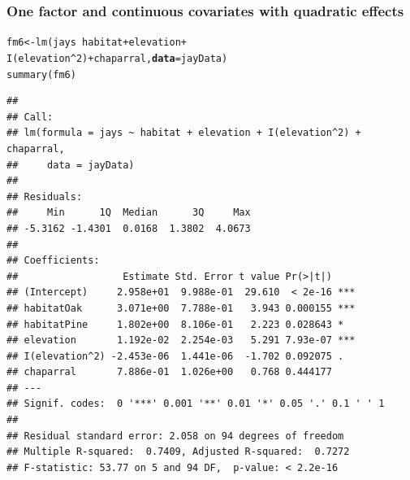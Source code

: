 \documentclass[color=usenames,dvipsnames]{beamer}\usepackage[]{graphicx}\usepackage[]{color}
\makeatletter
\newcommand{\hlnum}[1]{\textcolor[rgb]{0.69,0.494,0}{#1}}%
\newcommand{\hlopt}[1]{\textcolor[rgb]{0,0,0}{#1}}%
\newcommand{\hlstd}[1]{\textcolor[rgb]{0,0,0}{#1}}%
\newcommand{\hlkwb}[1]{\textcolor[rgb]{0,0.341,0.682}{#1}}%
\newcommand{\hlkwc}[1]{\textcolor[rgb]{0,0,0}{\textbf{#1}}}%
\newcommand{\hlkwd}[1]{\textcolor[rgb]{0.004,0.004,0.506}{#1}}%
\newenvironment{kframe}{%
 \def\at@end@of@kframe{}%
 \ifinner\ifhmode%
  \def\at@end@of@kframe{\end{minipage}}%
  \begin{minipage}{\columnwidth}%
 \fi\fi%
 \def\FrameCommand##1{\hskip\@totalleftmargin \hskip-\fboxsep
 \colorbox{shadecolor}{##1}\hskip-\fboxsep
     \hskip-\linewidth \hskip-\@totalleftmargin \hskip\columnwidth}%
 \MakeFramed {\advance\hsize-\width
   \@totalleftmargin\z@ \linewidth\hsize
   \@setminipage}}%
 {\par\unskip\endMakeFramed%
 \at@end@of@kframe}
\newenvironment{knitrout}{}{} %
\makeatother
\begin{document}
\begin{frame}[fragile]
  \frametitle{\small One factor and continuous covariates with quadratic effects}
  \tiny
\begin{knitrout}\tiny
{}\color{fgcolor}\begin{kframe}
\begin{alltt}
\hlstd{fm6} \hlkwb{<-} \hlkwd{lm}\hlstd{(jays} \hlopt{~} \hlstd{habitat} \hlopt{+} \hlstd{elevation} \hlopt{+}
          \hlkwd{I}\hlstd{(elevation}\hlopt{^}\hlnum{2}\hlstd{)} \hlopt{+} \hlstd{chaparral,} \hlkwc{data}\hlstd{=jayData)}
\hlkwd{summary}\hlstd{(fm6)}
\end{alltt}
\begin{verbatim}
## 
## Call:
## lm(formula = jays ~ habitat + elevation + I(elevation^2) + chaparral, 
##     data = jayData)
## 
## Residuals:
##     Min      1Q  Median      3Q     Max 
## -5.3162 -1.4301  0.0168  1.3802  4.0673 
## 
## Coefficients:
##                  Estimate Std. Error t value Pr(>|t|)    
## (Intercept)     2.958e+01  9.988e-01  29.610  < 2e-16 ***
## habitatOak      3.071e+00  7.788e-01   3.943 0.000155 ***
## habitatPine     1.802e+00  8.106e-01   2.223 0.028643 *  
## elevation       1.192e-02  2.254e-03   5.291 7.93e-07 ***
## I(elevation^2) -2.453e-06  1.441e-06  -1.702 0.092075 .  
## chaparral       7.886e-01  1.026e+00   0.768 0.444177    
## ---
## Signif. codes:  0 '***' 0.001 '**' 0.01 '*' 0.05 '.' 0.1 ' ' 1
## 
## Residual standard error: 2.058 on 94 degrees of freedom
## Multiple R-squared:  0.7409,	Adjusted R-squared:  0.7272 
## F-statistic: 53.77 on 5 and 94 DF,  p-value: < 2.2e-16
\end{verbatim}
\end{kframe}
\end{knitrout}
\end{frame}
\end{document}
